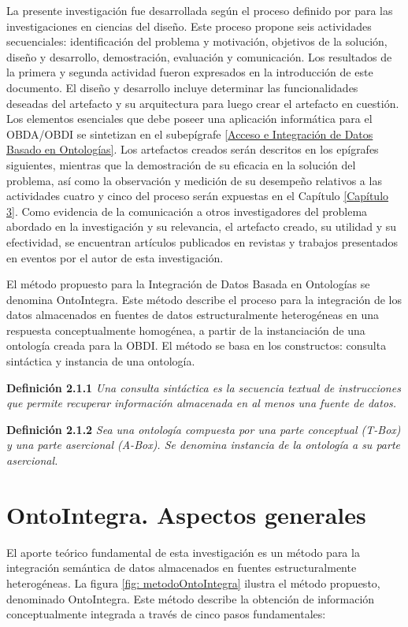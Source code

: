 La presente investigación fue desarrollada según el proceso definido por \cite{Peffers2006} para las investigaciones en ciencias del diseño. Este proceso propone seis actividades secuenciales: identificación del problema y motivación, objetivos de la solución, diseño y desarrollo, demostración, evaluación y comunicación. Los resultados de la primera y segunda actividad fueron expresados en la introducción de este documento. El diseño y desarrollo incluye determinar las funcionalidades deseadas del artefacto y su arquitectura para luego crear el artefacto en cuestión. Los elementos esenciales que debe poseer una aplicación informática para el OBDA/OBDI se sintetizan en el subepígrafe \ref{Acceso e Integración de Datos Basado en Ontologías}. Los artefactos
creados serán descritos en los epígrafes siguientes, mientras que la demostración de su eficacia en la solución del problema, así como la observación y medición de su desempeño relativos a las actividades cuatro y cinco del proceso serán expuestas en el Capítulo \ref{Capítulo 3}. Como evidencia de la comunicación a otros investigadores del problema abordado en la investigación y su relevancia, el artefacto creado, su utilidad y su efectividad, se encuentran artículos publicados en revistas y trabajos presentados en eventos por el autor de esta investigación.

El método propuesto para la Integración de Datos Basada en Ontologías se denomina OntoIntegra. Este método describe el proceso para la integración de los datos almacenados en fuentes de datos estructuralmente heterogéneas en una respuesta conceptualmente homogénea, a partir de la instanciación de una ontología creada para la OBDI. El método se basa en los constructos: consulta sintáctica y instancia de una ontología.

\textbf{Definición 2.1.1} \textit{Una consulta sintáctica es la secuencia textual de instrucciones que permite recuperar información almacenada en al menos una fuente de datos.}

\textbf{Definición 2.1.2} \textit{Sea una ontología compuesta por una parte conceptual (T-Box) y una parte asercional (A-Box). Se denomina instancia de la ontología a su parte asercional.}

\section{OntoIntegra. Aspectos generales}
El aporte teórico fundamental de esta investigación es un método para la integración semántica de datos almacenados en fuentes estructuralmente heterogéneas. La figura \ref{fig: metodoOntoIntegra} ilustra el método propuesto, denominado OntoIntegra. Este método describe la obtención de información conceptualmente integrada a través de cinco pasos fundamentales:

